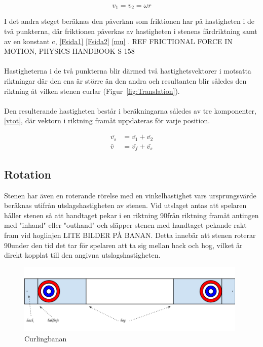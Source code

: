 \documentclass[11pt]{article} %
\begin{document}
\begin{equation}\label{vsida_init}
 v_1 = v_2 = \omega r
 \end{equation}

I det andra steget beräknas den påverkan som friktionen har på hastigheten i de två punkterna, där friktionen påverkas av hastigheten i stenens färdriktning samt av en konstant c,  \eqref{Fsida1} \eqref{Fsida2} \eqref{mu} . 
REF FRICTIONAL FORCE IN MOTION, PHYSICS HANDBOOK S 158
\\\\Hastigheterna i de två punkterna blir därmed två hastighetsvektorer i motsatta riktningar där den ena är större än den andra och resultanten blir således den riktning åt vilken stenen curlar (Figur~\ref{fig:Translation}). 
\\\\Den resulterande hastigheten består i beräkningarna således av tre komponenter, \eqref{vtot}, där vektorn i riktning framåt uppdateras för varje position. 

 \begin{align}\label{vtot}
 \bar{v_s}& = \bar{v_1}+\bar{v_2}\\
 \bar{v}&=\bar{v_f}+\bar{v_s}
 \end{align}

\subsection{Rotation}


Stenen har även en roterande rörelse med en vinkelhastighet vars ursprungsvärde beräknas utifrån utslagshastigheten av stenen.
Vid utslaget antas att spelaren håller stenen så att handtaget pekar i en riktning 90\textdegree  från riktning framåt antingen med "inhand" eller "outhand" och släpper stenen med handtaget pekande rakt fram vid hoglinjen LITE BILDER PÅ BANAN. Detta innebär att stenen roterar 90\textdegree under den tid det tar för spelaren att ta sig mellan hack och hog, vilket är direkt kopplat till den angivna utslagshastigheten. 

\begin{figure}[ht!]
\centering
\includegraphics[width=110mm]{bana.png}
\caption{Curlingbanan}
\label{fig:bana}
\label{overflow}
\end{figure}
\end{document}
